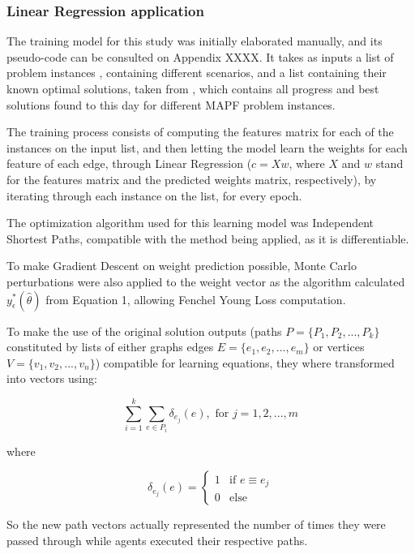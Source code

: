 \subsubsection{Linear Regression application}

The training model for this study was initially elaborated manually, and its pseudo-code can be consulted on Appendix XXXX. It takes as inputs a list of problem instances \cite{shenTrackingProgressMultiAgent2023}, containing different scenarios, and a list containing their known optimal solutions, taken from \cite{shenTrackingProgressMultiAgent2023}, which contains all progress and best solutions found to this day for different MAPF problem instances.

The training process consists of computing the features matrix for each of the instances on the input list, and then letting the model learn the weights for each feature of each edge, through Linear Regression ($c = Xw$, where $X$ and $w$ stand for the features matrix and the predicted weights matrix, respectively), by iterating through each instance on the list, for every epoch.

The optimization algorithm used for this learning model was Independent Shortest Paths, compatible with the method being applied, as it is differentiable.

To make Gradient Descent on weight prediction possible, Monte Carlo perturbations \cite{berthetLearningDifferentiablePertubed2020} were also applied to the weight vector as the algorithm calculated $y^*_\epsilon(\hat\theta)$ from Equation 1, allowing Fenchel Young Loss computation. 

To make the use of the original solution outputs (paths $P=\{P_1, P_2,...,P_k\}$ constituted by lists of either graphs edges $E=\{e_1,e_2, ..., e_m\}$ or vertices $V=\{v_1, v_2,...,v_n\}$) compatible for learning equations, they where transformed into vectors using:

\[
\sum^k_{i=1}\sum_{e \in P_i}\delta_{e_j}(e), \text{  for  } j = 1,2,...,m \tag{11}
\]

where

\[
\delta_{e_j}(e) = 
\begin{cases}
    1 & \text{if } e \equiv e_j \\
    0 & \text{else}
\end{cases}
\]

So the new path vectors actually represented the number of times they were passed through while agents executed their respective paths.

